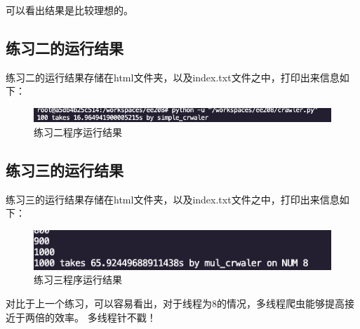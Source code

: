 \documentclass[UTF8]{ctexart}
\begin{document}
            可以看出结果是比较理想的。
        \subsection{练习二的运行结果}
            练习二的运行结果存储在html文件夹，以及index.txt文件之中，打印出来信息如下：
            \begin{figure}[ht]
                \centering
                \includegraphics[scale=0.5]{img/sim.png}
                \caption{练习二程序运行结果}
            \end{figure}
        \subsection{练习三的运行结果}
            练习三的运行结果存储在html文件夹，以及index.txt文件之中，打印出来信息如下：
            \begin{figure}[ht]
                \centering
                \includegraphics[scale=0.5]{img/mul.png}
                \caption{练习三程序运行结果}
            \end{figure}

            对比于上一个练习，可以容易看出，对于线程为8的情况，多线程爬虫能够提高接近于两倍的效率。
            多线程针不戳！
\end{document}
